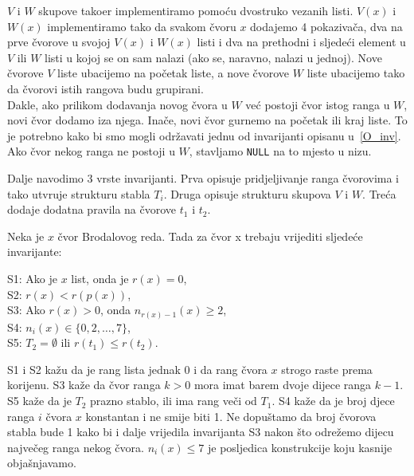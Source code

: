 $V$ i $W$ skupove tako\dj er implementiramo pomo\'{c}u dvostruko vezanih listi.
$V(x)$ i $W(x)$ implementiramo tako da svakom \v{c}voru $x$ dodajemo 4 pokaziva\v{c}a, dva na prve \v{c}vorove u svojoj $V(x)$ i $W(x)$ listi i dva na prethodni i sljede\'{c}i element u $V$ ili $W$ listi u kojoj se on sam nalazi (ako se, naravno, nalazi u jednoj).
Nove \v{c}vorove $V$ liste ubacijemo na po\v{c}etak liste, a nove \v{c}vorove $W$ liste ubacijemo tako da \v{c}vorovi istih rangova budu grupirani.\\
Dakle, ako prilikom dodavanja novog \v{c}vora u $W$ ve\'{c} postoji \v{c}vor istog ranga u $W$, novi \v{c}vor dodamo iza njega.
Ina\v{c}e, novi \v{c}vor gurnemo na po\v{c}etak ili kraj liste.
To je potrebno kako bi smo mogli odr\v{z}avati jednu od invarijanti opisanu u~\ref{O_inv}.
Ako \v{c}vor nekog ranga ne postoji u $W$, stavljamo \texttt{NULL} na to mjesto u nizu.

Dalje navodimo 3 vrste invarijanti.
Prva opisuje pridjeljivanje ranga \v{c}vorovima i tako utvr\dj uje strukturu stabla $T_{i}$.
Druga opisuje strukturu skupova $V$ i $W$.
Tre\'{c}a dodaje dodatna pravila na \v{c}vorove $t_{1}$ i $t_{2}$.

\begin{defn}\label{S_inv}
  Neka je $x$ \v{c}vor Brodalovog reda. Tada za \v{c}vor x trebaju vrijediti sljede\'{c}e invarijante:
  \begin{myindentpar}{15pt}
    S1: Ako je $x$ list, onda je $r(x) = 0$, \\
    S2: $r(x) < r(p(x))$, \\
    S3: Ako $r(x) > 0$, onda $n_{r(x)-1}(x) \ge 2$, \\
    S4: $n_{i}(x) \in \{0,2,\ldots,7\}$, \\
    S5: $T_{2} = \emptyset $ ili $r(t_{1}) \le r(t_{2})$.
  \end{myindentpar}
\end{defn}

S1 i S2 ka\v{z}u da je rang lista jednak 0 i da rang \v{c}vora $x$ strogo raste prema korijenu.
S3 ka\v{z}e da \v{c}vor ranga $k > 0$ mora imat barem dvoje dijece ranga $k - 1$.
S5 ka\v{z}e da je $T_{2}$ prazno stablo, ili ima rang ve\v{c}i od $T_{1}$.
S4 ka\v{z}e da je broj djece ranga $i$ \v{c}vora $x$ konstantan i ne smije biti 1.
Ne dopu\v{s}tamo da broj \v{c}vorova stabla bude 1 kako bi i dalje vrijedila invarijanta S3 nakon \v{s}to odre\v{z}emo dijecu najve\v{c}eg ranga nekog \v{c}vora. $n_{i}(x) \le 7$ je posljedica konstrukcije koju kasnije obja\v{s}njavamo.

